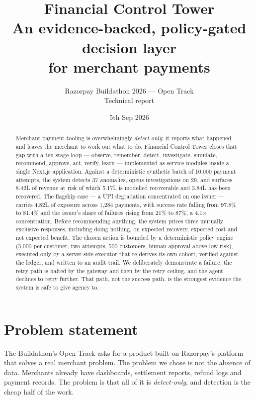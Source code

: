 \documentclass[10pt,twocolumn,a4paper]{article}
\title{\vspace{-9mm}\textbf{Financial Control Tower}\\[2mm]
  \large An evidence-backed, policy-gated decision layer\\for merchant payments}
\author{Razorpay Buildathon 2026 --- Open Track\\[1mm]
  \small Technical report}
\date{5th Sep 2026}
\newcommand{\rs}{\rupee}%
\newcommand{\rs}{\textrm{INR}\,}%
\begin{document}
\maketitle

\begin{abstract}
\noindent
Merchant payment tooling is overwhelmingly \emph{detect-only}: it reports what
happened and leaves the merchant to work out what to do. Financial Control Tower
closes that gap with a ten-stage loop --- observe, remember, detect,
investigate, simulate, recommend, approve, act, verify, learn --- implemented as
service modules inside a single Next.js application. Against a deterministic
synthetic batch of 10{,}000 payment attempts, the system detects 37 anomalies,
opens investigations on 29, and surfaces \rs{}8.42L of revenue at risk of which
\rs{}5.17L is modelled recoverable and \rs{}3.84L has been recovered. The
flagship case --- a UPI degradation concentrated on one issuer --- carries
\rs{}4.82L of exposure across 1{,}284 payments, with success rate falling from
97.8\% to 81.4\% and the issuer's share of failures rising from 21\% to 87\%, a
4.1$\times$ concentration. Before recommending anything, the system prices three
mutually exclusive responses, including doing nothing, on expected recovery,
expected cost and net expected benefit. The chosen action is bounded by a
deterministic policy engine (\rs{}5{,}000 per customer, two attempts, 500
customers, human approval above low risk), executed only by a server-side
executor that re-derives its own cohort, verified against the ledger, and
written to an audit trail. We deliberately demonstrate a failure: the retry path
is halted by the gateway and then by the retry ceiling, and the agent declines to
retry further. That path, not the success path, is the strongest evidence the
system is safe to give agency to.
\end{abstract}

\section{Problem statement}

The Buildathon's Open Track asks for a product built on Razorpay's platform that
solves a real merchant problem. The problem we chose is not the absence of data.
Merchants already have dashboards, settlement reports, refund logs and payment
records. The problem is that all of it is \emph{detect-only}, and detection is
the cheap half of the work.
\end{document}
